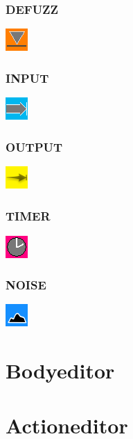 \documentclass{scrartcl}
\begin{document}
\subsubsection{DEFUZZ}
\includegraphics{../gui/pics/editor_logo_defuzz.png}
\subsubsection{INPUT}
\includegraphics{../gui/pics/editor_logo_input.png}
\subsubsection{OUTPUT}
\includegraphics{../gui/pics/editor_logo_output.png}
\subsubsection{TIMER}
\includegraphics{../gui/pics/editor_logo_timer.png}
\subsubsection{NOISE}
\includegraphics{../gui/pics/editor_logo_noise.png}

\section{Bodyeditor}

\section{Actioneditor}
\end{document}
